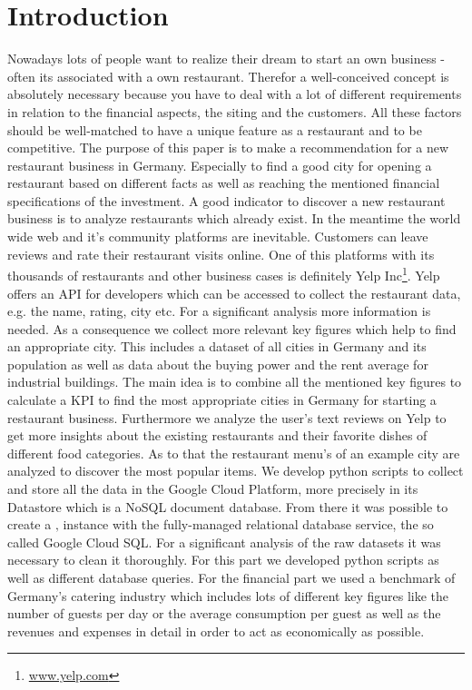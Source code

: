 \section{Introduction}
\label{sec:introduction}
Nowadays lots of people want to realize their dream to start an own business - often its associated with a own restaurant. Therefor a well-conceived concept is absolutely necessary because you have to deal with a lot of different requirements in relation to the financial aspects, the siting and the customers. All these factors should be well-matched to have a unique feature as a restaurant and to be competitive. \newline
The purpose of this paper is to make a recommendation for a new restaurant business in Germany. Especially to find a good city for opening a restaurant based on different facts as well as reaching the mentioned financial specifications of the investment.
A good indicator to discover a new restaurant business is to analyze restaurants which already exist. In the meantime the world wide web and it's community platforms are inevitable. Customers can leave reviews and rate their restaurant visits online. One of this platforms with its thousands of restaurants and other business cases is definitely Yelp Inc\footnote{\href{https://www.yelp.com/}{www.yelp.com}}. Yelp offers an \ac{API} for developers which can be accessed to collect the restaurant data, e.g. the name, rating, city etc. For a significant analysis more information is needed. As a consequence we collect more relevant key figures which help to find an appropriate city. This includes a dataset of all cities in Germany and its population as well as data about the buying power and the rent average for industrial buildings. The main idea is to combine all the mentioned key figures to calculate a \ac{KPI} to find the most appropriate cities in Germany for starting a restaurant business. Furthermore we analyze the user's text reviews on Yelp to get more insights about the existing restaurants and their favorite dishes of different food categories. As to that the restaurant menu's of an example city are analyzed to discover the most popular items. We develop python scripts to collect and store all the data in the Google Cloud Platform, more precisely in its Datastore which is a \ac{NoSQL} document database. From there it was possible to create a \pg{}‚ instance with the fully-managed relational database service, the so called Google Cloud SQL. For a significant analysis of the raw datasets it was necessary to clean it thoroughly. For this part we developed python scripts as well as different database queries. \newline For the financial part we used a benchmark of Germany's catering industry which includes lots of different key figures like the number of guests per day or the average consumption per guest as well as the revenues and expenses in detail in order to act as economically as possible.